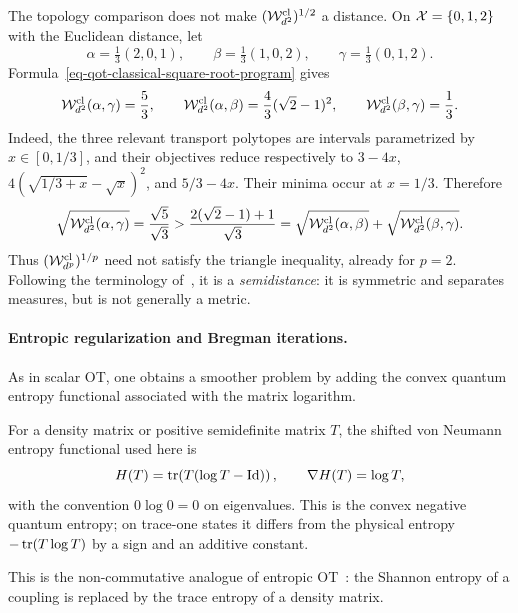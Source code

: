 \begin{example}\label{ex-classical-square-root-triangle-failure}
	The topology comparison does not make $(\mathcal W_{d^2}^{\mathrm{cl}})^{1/2}$ a distance. On $\mathcal{X}=\{0,1,2\}$ with the Euclidean distance, let
	\[
		\alpha=\tfrac13(2,0,1),
		\qquad
		\beta=\tfrac13(1,0,2),
		\qquad
		\gamma=\tfrac13(0,1,2).
	\]
	Formula~\eqref{eq-qot-classical-square-root-program} gives
	\[
		\mathcal W_{d^2}^{\mathrm{cl}}(\alpha,\gamma)=\frac53,
		\qquad
		\mathcal W_{d^2}^{\mathrm{cl}}(\alpha,\beta)=\frac43(\sqrt2-1)^2,
		\qquad
		\mathcal W_{d^2}^{\mathrm{cl}}(\beta,\gamma)=\frac13.
	\]
	Indeed, the three relevant transport polytopes are intervals parametrized by $x\in[0,1/3]$, and their objectives reduce respectively to $3-4x$, $4(\sqrt{1/3+x}-\sqrt x)^2$, and $5/3-4x$. Their minima occur at $x=1/3$. Therefore
	\[
		\sqrt{\mathcal W_{d^2}^{\mathrm{cl}}(\alpha,\gamma)}
		=
		\frac{\sqrt5}{\sqrt3}
		>
		\frac{2(\sqrt2-1)+1}{\sqrt3}
		=
		\sqrt{\mathcal W_{d^2}^{\mathrm{cl}}(\alpha,\beta)}
		+
		\sqrt{\mathcal W_{d^2}^{\mathrm{cl}}(\beta,\gamma)}.
	\]
	Thus $(\mathcal W_{d^p}^{\mathrm{cl}})^{1/p}$ need not satisfy the triangle inequality, already for $p=2$. Following the terminology of~\cite{ColeEcksteinFriedlandZyczkowski2023}, it is a \emph{semidistance}: it is symmetric and separates measures, but is not generally a metric.
\end{example}

\paragraph{Entropic regularization and Bregman iterations.}
As in scalar OT, one obtains a smoother problem by adding the convex quantum entropy functional associated with the matrix logarithm.

\begin{defn}\label{def-von-neumann-quantum-entropy}
	For a density matrix or positive semidefinite matrix $T$, the shifted von Neumann entropy functional used here is
	\[
		H(T)=\operatorname{tr}\!\left(T(\log T-\mathrm{Id})\right),
		\qquad
		\nabla H(T)=\log T,
	\]
	with the convention $0\log0=0$ on eigenvalues. This is the convex negative quantum entropy; on trace-one states it differs from the physical entropy $-\operatorname{tr}(T\log T)$ by a sign and an additive constant.
\end{defn}
This is the non-commutative analogue of entropic OT~\cite{2016-peyre-qot,chakrabarti2019quantum}: the Shannon entropy of a coupling is replaced by the trace entropy of a density matrix.

